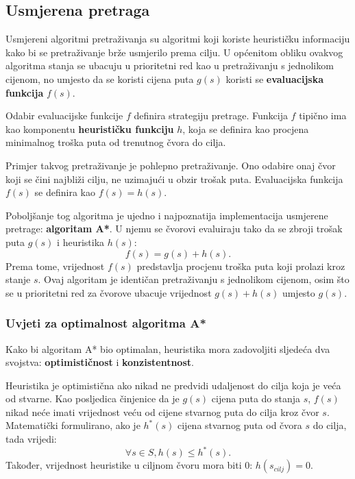 \documentclass[times, utf8, zavrsni, numeric]{fer}
\begin{document}
\subsection{Usmjerena pretraga}

\par Usmjereni algoritmi pretraživanja su algoritmi koji koriste heurističku informaciju kako bi se pretraživanje brže usmjerilo prema cilju.
U općenitom obliku ovakvog algoritma stanja se ubacuju u prioritetni red kao u pretraživanju s jednolikom cijenom, no umjesto da se koristi cijena puta \(g(s)\) koristi se \textbf{evaluacijska funkcija} \(f(s)\).

\par Odabir evaluacijske funkcije \(f\) definira strategiju pretrage. 
Funkcija \(f\) tipično ima kao komponentu \textbf{heurističku funkciju} \(h\), koja se definira kao procjena minimalnog troška puta od trenutnog čvora do cilja\cite{book:AIModernApproach}.

\par Primjer takvog pretraživanje je pohlepno pretraživanje. 
Ono odabire onaj čvor koji se čini najbliži cilju, ne uzimajući u obzir trošak puta.
Evaluacijska funkcija \(f(s)\) se definira kao \(f(s) = h(s)\).

\par Poboljšanje tog algoritma je ujedno i najpoznatija implementacija usmjerene pretrage: \textbf{algoritam A*}. 
U njemu se čvorovi evaluiraju tako da se zbroji trošak puta \(g(s)\) i heuristika \(h(s)\): 
\[f(s) = g(s) + h(s).\]
Prema tome, vrijednost \(f(s)\) predstavlja procjenu troška puta koji prolazi kroz stanje \(s\).
Ovaj algoritam je identičan pretraživanju s jednolikom cijenom, osim što se u prioritetni red za čvorove ubacuje vrijednost \(g(s) + h(s)\) umjesto \(g(s)\).

\subsubsection{Uvjeti za optimalnost algoritma A*}
Kako bi algoritam A* bio optimalan, heuristika mora zadovoljiti sljedeća dva svojstva: \textbf{optimističnost} i \textbf{konzistentnost}.

\par Heuristika je optimistična ako nikad ne predvidi udaljenost do cilja koja je veća od stvarne. 
Kao posljedica činjenice da je \(g(s)\) cijena puta do stanja \(s\), \(f(s)\) nikad neće imati vrijednost veću od cijene stvarnog puta do cilja kroz čvor \(s\).
Matematički formulirano, ako je \(h^*(s)\) cijena stvarnog puta od čvora \(s\) do cilja, tada vrijedi:
\[\forall s \in S, h(s) \leq h^*(s).\]
Također, vrijednost heuristike u ciljnom čvoru mora biti 0: \(h(s_{cilj}) = 0\).
\end{document}
